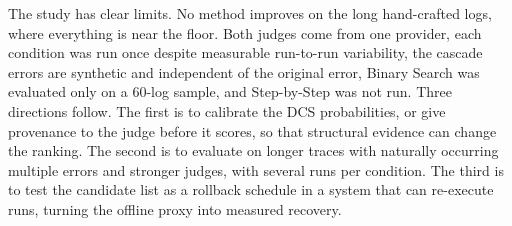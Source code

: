 \documentclass[conference]{IEEEtran}
\begin{document}
The study has clear limits. No method improves on the long hand-crafted logs, where everything is near the floor. Both judges come from one provider, each condition was run once despite measurable run-to-run variability, the cascade errors are synthetic and independent of the original error, Binary Search was evaluated only on a 60-log sample, and Step-by-Step was not run. Three directions follow. The first is to calibrate the DCS probabilities, or give provenance to the judge before it scores, so that structural evidence can change the ranking. The second is to evaluate on longer traces with naturally occurring multiple errors and stronger judges, with several runs per condition. The third is to test the candidate list as a rollback schedule in a system that can re-execute runs, turning the offline proxy into measured recovery.



\end{document}
